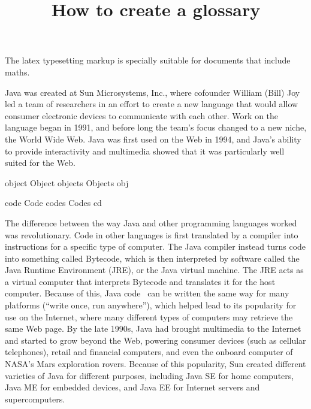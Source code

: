 \documentclass{article}
\title{How to create a glossary}
\author{ }
\date{ }
\begin{document}
\maketitle
 
The \Gls{latex} typesetting markup is specially suitable for documents that include \gls{maths}. 

Java was created at Sun Microsystems, Inc., where cofounder William (Bill) Joy led a team of researchers in an effort to create a 
new language that would allow consumer electronic devices to communicate with each other. Work on the language began in 1991, and 
before long the team’s focus changed to a new niche, the World Wide Web. Java was first used on the Web in 1994, and Java’s 
ability to provide interactivity and multimedia showed that it was particularly well suited for the Web.

object
Object
objects
Objects
obj

code
Code
codes
Codes
cd

The difference between the way Java and other programming languages worked was revolutionary. Code in other languages is first 
translated by a compiler into instructions for a specific type of computer. The Java compiler instead turns code into something 
called Bytecode, which is then interpreted by software called the Java Runtime Environment (JRE), or the Java virtual machine. 
The JRE acts as a virtual computer that interprets Bytecode and translates it for the host computer. Because of this, Java code \
can be written the same way for many platforms (“write once, run anywhere”), which helped lead to its popularity for use on the 
Internet, where many different types of computers may retrieve the same Web page. By the late 1990s, Java had brought multimedia 
to the Internet and started to grow beyond the Web, powering consumer devices (such as cellular telephones), retail and financial 
computers, and even the onboard computer of NASA’s Mars exploration rovers. Because of this popularity, Sun created different 
varieties of Java for different purposes, including Java SE for home computers, Java ME for embedded devices, and Java EE for 
Internet servers and supercomputers.
 
\clearpage
 
\printglossaries
 
\end{document}
